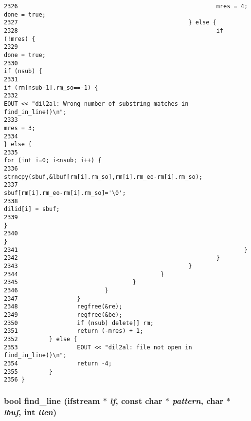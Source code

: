 \begin{verbatim}
2326                                                         mres = 4; done = true;
2327                                                 } else {
2328                                                         if (!mres) {
2329                                                                 done = true;
2330                                                                 if (nsub) {
2331                                                                         if (rm[nsub-1].rm_so==-1) {
2332                                                                                 EOUT << "dil2al: Wrong number of substring matches in find_in_line()\n";
2333                                                                                 mres = 3;
2334                                                                         } else {
2335                                                                                 for (int i=0; i<nsub; i++) {
2336                                                                                         strncpy(sbuf,&lbuf[rm[i].rm_so],rm[i].rm_eo-rm[i].rm_so);
2337                                                                                         sbuf[rm[i].rm_eo-rm[i].rm_so]='\0';
2338                                                                                         dilid[i] = sbuf;
2339                                                                                 }
2340                                                                         }
2341                                                                 }
2342                                                         }
2343                                                 }
2344                                         }
2345                                 }
2346                         }
2347                 }
2348                 regfree(&re);
2349                 regfree(&be);
2350                 if (nsub) delete[] rm;
2351                 return (-mres) + 1;
2352         } else {
2353                 EOUT << "dil2al: file not open in find_in_line()\n";
2354                 return -4;
2355         }
2356 }
\end{verbatim}\normalsize 
{}
\subsubsection{\setlength{\rightskip}{0pt plus 5cm}bool find\_\-line (ifstream $\ast$ {\em lf}, const char $\ast$ {\em pattern}, char $\ast$ {\em lbuf}, int {\em llen})}\label{utilities_8cc_a46}




